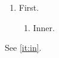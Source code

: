 \documentclass{article}
\makeatletter
\newcommand{\mylabel}[2]{\addtocounter{\@listctr}{-1}\refstepcounter{\@listctr}#2\def\@currentlabel{#2}\label{#1}}
\makeatother
\begin{document}
\begin{enumerate}
\item First.
\begin{enumerate}
\item[\mylabel{it:in}{(x)}] Inner.
\end{enumerate}
\end{enumerate}
See \ref{it:in}.
\end{document}
